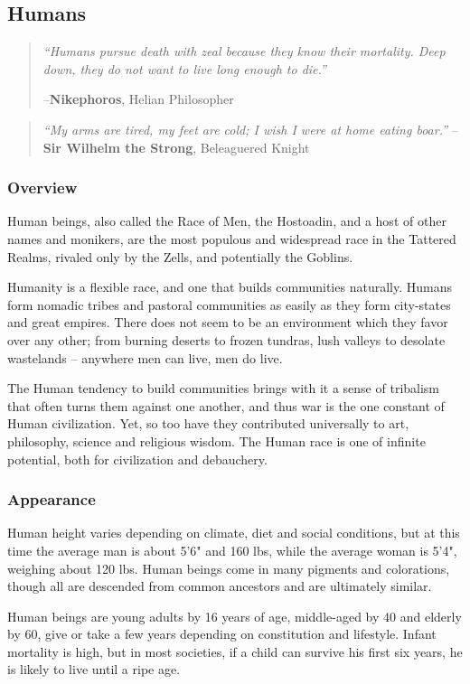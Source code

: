 \documentclass[oneside,11pt,english]{book}
\begin{document}
\subsection{Humans}\label{sec:humans}
\begin{quote}
  \emph{``Humans pursue death with zeal because they know their mortality. 
    Deep down, they do not want to live long enough to die.''}

  \hfill --\textbf{Nikephoros}, Helian Philosopher 
\end{quote}
\begin{quote} 
  \emph{``My arms are tired, my feet are cold; 
    I wish I were at home eating boar.''}
  \hfill--\textbf{Sir Wilhelm the Strong}, Beleaguered Knight
\end{quote}
\subsubsection*{Overview}
Human beings, also called the Race of Men, the Hostoadin, and a host of other
names and monikers, are the most populous and widespread race in the Tattered
Realms, rivaled only by the Zells, and potentially the Goblins.

Humanity is a flexible race, and one that builds communities naturally. Humans
form nomadic tribes and pastoral communities as easily as they form city-states
and great empires. There does not seem to be an environment which they favor
over any other; from burning deserts to frozen tundras, lush valleys to desolate
wastelands -- anywhere men can live, men do live.

The Human tendency to build communities brings with it a sense of tribalism that
often turns them against one another, and thus war is the one constant of Human
civilization. Yet, so too have they contributed universally to art, philosophy,
science and religious wisdom. The Human race is one of infinite potential, both
for civilization and debauchery.


\subsubsection*{Appearance} 
Human height varies depending on climate, diet and social conditions, but at
this time the average man is about 5'6" and 160 lbs, while the average woman is
5'4", weighing about 120 lbs. Human beings come in many pigments and
colorations, though all are descended from common ancestors and are ultimately
similar.

Human beings are young adults by 16 years of age, middle-aged by 40 and elderly
by 60, give or take a few years depending on constitution and lifestyle. Infant
mortality is high, but in most societies, if a child can survive his first six
years, he is likely to live until a ripe age.
\end{document}
